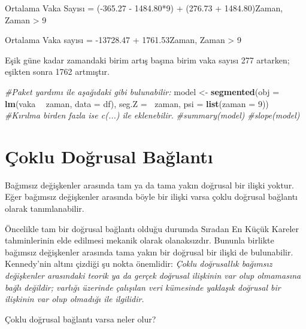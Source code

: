 \documentclass[
]{book}
\newenvironment{Shaded}{\begin{snugshade}}{\end{snugshade}}
\newcommand{\CommentTok}[1]{\textcolor[rgb]{0.56,0.35,0.01}{\textit{#1}}}
\newcommand{\DataTypeTok}[1]{\textcolor[rgb]{0.13,0.29,0.53}{#1}}
\newcommand{\DecValTok}[1]{\textcolor[rgb]{0.00,0.00,0.81}{#1}}
\newcommand{\KeywordTok}[1]{\textcolor[rgb]{0.13,0.29,0.53}{\textbf{#1}}}
\newcommand{\NormalTok}[1]{#1}
\newcommand{\OperatorTok}[1]{\textcolor[rgb]{0.81,0.36,0.00}{\textbf{#1}}}
\newcommand{\StringTok}[1]{\textcolor[rgb]{0.31,0.60,0.02}{#1}}
\begin{document}
Ortalama Vaka Sayısı = (-365.27 - 1484.80*9) + (276.73 + 1484.80)Zaman, Zaman \textgreater{} 9

Ortalama Vaka sayısı = -13728.47 + 1761.53Zaman, Zaman \textgreater{} 9

Eşik güne kadar zamandaki birim artış başına birim vaka sayısı 277 artarken; eşikten sonra 1762 artmıştır.

\begin{Shaded}
\begin{Highlighting}[]
\CommentTok{#Paket yardımı ile aşağıdaki gibi bulunabilir:}
\NormalTok{model <-}\StringTok{ }\KeywordTok{segmented}\NormalTok{(}\DataTypeTok{obj =} \KeywordTok{lm}\NormalTok{(vaka }\OperatorTok{~}\StringTok{ }\NormalTok{zaman, }\DataTypeTok{data =}\NormalTok{ df), }\DataTypeTok{seg.Z =} \OperatorTok{~}\NormalTok{zaman, }\DataTypeTok{psi =} \KeywordTok{list}\NormalTok{(}\DataTypeTok{zaman =} \DecValTok{9}\NormalTok{)) }\CommentTok{#Kırılma birden fazla ise c(...) ile eklenebilir.}
\CommentTok{#summary(model)}
\CommentTok{#slope(model)}
\end{Highlighting}
\end{Shaded}

\hypertarget{uxe7oklu-doux11frusal-baux11flantux131}{%
\chapter{Çoklu Doğrusal Bağlantı}\label{uxe7oklu-doux11frusal-baux11flantux131}}

Bağımsız değişkenler arasında tam ya da tama yakın doğrusal bir ilişki yoktur. Eğer bağımsız değişkenler arasında böyle bir ilişki varsa çoklu doğrusal bağlantı olarak tanımlanabilir.

Öncelikle tam bir doğrusal bağlantı olduğu durumda Sıradan En Küçük Kareler tahminlerinin elde edilmesi mekanik olarak olanaksızdır. Bununla birlikte bağımsız değişkenler arasında tama yakın bir doğrusal bir ilişki de bulunabilir. Kennedy'nin altını çizdiği şu nokta önemlidir: \emph{Çoklu doğrusallık bağımsız değişkenler arasındaki teorik ya da gerçek doğrusal ilişkinin var olup olmamasına bağlı değildir; varlığı üzerinde çalışılan veri kümesinde yaklaşık doğrusal bir ilişkinin var olup olmadığı ile ilgilidir.}

Çoklu doğrusal bağlantı varsa neler olur?
\end{document}
